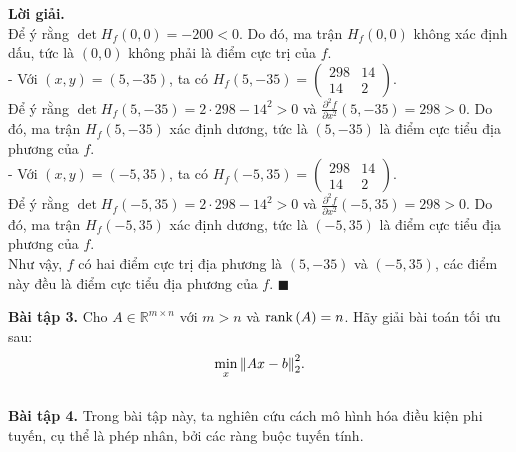 \documentclass[12pt]{article}
\newcommand{\R}{\mathbb{R}}
\newenvironment{solution}{%
     \setlength\parindent{0pt}\par\medskip\textbf{Lời giải.}\quad}{%
     \hfill\tiny$\blacksquare$\par\medskip}
\begin{document}
\begin{solution}
        \\
        Để ý rằng $\det{H_f(0, 0)} = -200 < 0$. Do đó, ma trận $H_f(0, 0)$ không xác định dấu, tức là $(0, 0)$ không phải là điểm cực trị của $f$.
        \\
        - Với $(x, y) = (5, -35)$, ta có $H_f(5, -35) = \begin{pmatrix}
            298 & 14\\
            14 & 2
        \end{pmatrix}$.
        \\
        Để ý rằng $\det{H_f(5, -35)} = 2 \cdot 298 - 14^2 > 0$ và $\frac{\partial^2 f}{\partial x^2}(5, -35) = 298 > 0$. Do đó, ma trận $H_f(5, -35)$ xác định dương, tức là $(5, -35)$ là điểm cực tiểu địa phương của $f$.
        \\
        - Với $(x, y) = (-5, 35)$, ta có $H_f(-5, 35) = \begin{pmatrix}
            298 & 14\\
            14 & 2
        \end{pmatrix}$.
        \\
        Để ý rằng $\det{H_f(-5, 35)} = 2 \cdot 298 - 14^2 > 0$ và $\frac{\partial^2 f}{\partial x^2}(-5, 35) = 298 > 0$. Do đó, ma trận $H_f(-5, 35)$ xác định dương, tức là $(-5, 35)$ là điểm cực tiểu địa phương của $f$.
        \\
        Như vậy, $f$ có hai điểm cực trị địa phương là $(5, -35)$ và $(-5, 35)$, các điểm này đều là điểm cực tiểu địa phương của $f$.
    \end{solution}
    \textbf{Bài tập 3.} Cho $A \in \R^{m \times n}$ với $m > n$ và $\rank{(A)} = n$. Hãy giải bài toán tối ưu sau:
    \begin{align*}
        \min\limits_{x} {\norm{Ax - b}_2^2}.
    \end{align*}
    \\
    \textbf{Bài tập 4.} Trong bài tập này, ta nghiên cứu cách mô hình hóa điều kiện phi tuyến, cụ thể là
    phép nhân, bởi các ràng buộc tuyến tính.
\end{document}
